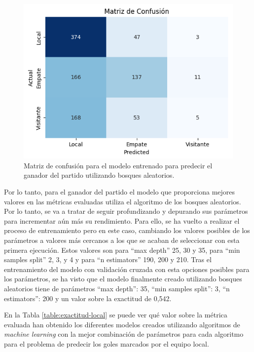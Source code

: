 \begin{figure}[H]
    \centering
    \includegraphics[scale=0.60]{svg/matriz-bosque-ganador.png}
    \caption{Matriz de confusión para el modelo entrenado para predecir el ganador del partido utilizando bosques aleatorios. }
    \label{fig:matriz-bosque-ganador}
\end{figure}


Por lo tanto, para el ganador del partido el modelo que proporciona mejores valores en las métricas evaluadas utiliza el algoritmo de los bosques aleatorios. Por lo tanto, se va a tratar de seguir profundizando y depurando sus parámetros para incrementar aún más su rendimiento. Para ello, se ha vuelto a realizar el proceso de entrenamiento pero en este caso, cambiando los valores posibles de los parámetros a valores más cercanos a los que se acaban de seleccionar con esta primera ejecución. Estos valores son para ``max depth'' 25, 30 y 35, para ``min samples split'' 2, 3, y 4 y para ``n estimators'' 190, 200 y 210. Tras el entrenamiento del modelo con validación cruzada con esta opciones posibles para los parámetros, se ha visto que el modelo finalmente creado utilizando bosques aleatorios tiene de parámetros ``max depth'': 35, ``min samples split'': 3, ``n estimators'': 200 y un valor sobre la exactitud de 0,542.














En la Tabla \ref{table:exactitud-local} se puede ver qué valor sobre la métrica evaluada han obtenido los diferentes modelos creados utilizando algoritmos de \textit{machine learning} con la mejor combinación de parámetros para cada algoritmo para el problema de predecir los goles marcados por el equipo local.

